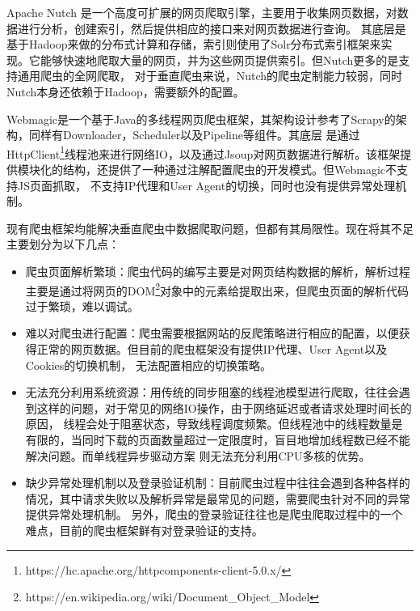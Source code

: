 \documentclass[master]{njuthesis}
\begin{document}
  Apache Nutch \cite{nutch2014apache} 是一个高度可扩展的网页爬取引擎，主要用于收集网页数据，对数据进行分析，创建索引，然后提供相应的接口来对网页数据进行查询。
  其底层是基于Hadoop来做的分布式计算和存储，索引则使用了Solr分布式索引框架来实现。它能够快速地爬取大量的网页，并为这些网页提供索引。但Nutch更多的是支持通用爬虫的全网爬取，
  对于垂直爬虫来说，Nutch的爬虫定制能力较弱，同时Nutch本身还依赖于Hadoop，需要额外的配置。

  Webmagic\cite{lu2017design}是一个基于Java的多线程网页爬虫框架，其架构设计参考了Scrapy的架构，同样有Downloader，Scheduler以及Pipeline等组件。其底层
  是通过HttpClient\footnote{https://hc.apache.org/httpcomponents-client-5.0.x/}线程池来进行网络IO，以及通过Jsoup对网页数据进行解析。该框架提供模块化的结构，还提供了一种通过注解配置爬虫的开发模式。但Webmagic不支持JS页面抓取，
  不支持IP代理和User Agent的切换，同时也没有提供异常处理机制。

  现有爬虫框架均能解决垂直爬虫中数据爬取问题，但都有其局限性。现在将其不足主要划分为以下几点：

  \begin{itemize}
    \item 爬虫页面解析繁琐：爬虫代码的编写主要是对网页结构数据的解析，解析过程主要是通过将网页的DOM\footnote{https://en.wikipedia.org/wiki/Document\_Object\_Model}对象中的元素给提取出来，但爬虫页面的解析代码过于繁琐，难以调试。
    \item 难以对爬虫进行配置：爬虫需要根据网站的反爬策略进行相应的配置，以便获得正常的网页数据。但目前的爬虫框架没有提供IP代理、User Agent以及Cookies的切换机制，
    无法配置相应的切换策略。
    \item 无法充分利用系统资源：用传统的同步阻塞的线程池模型进行爬取，往往会遇到这样的问题，对于常见的网络IO操作，由于网络延迟或者请求处理时间长的原因，
    线程会处于阻塞状态，导致线程调度频繁。但线程池中的线程数量是有限的，当同时下载的页面数量超过一定限度时，盲目地增加线程数已经不能解决问题。而单线程异步驱动方案
    则无法充分利用CPU多核的优势。
    \item 缺少异常处理机制以及登录验证机制：目前爬虫过程中往往会遇到各种各样的情况，其中请求失败以及解析异常是最常见的问题，需要爬虫针对不同的异常提供异常处理机制。
    另外，爬虫的登录验证往往也是爬虫爬取过程中的一个难点，目前的爬虫框架鲜有对登录验证的支持。
  \end{itemize}
\end{document}
